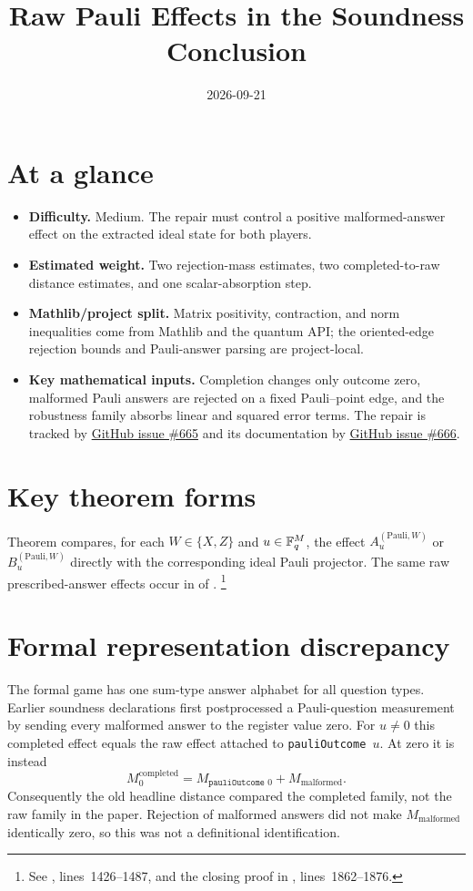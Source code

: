 \documentclass[11pt]{article}
\title{Raw Pauli Effects in the Soundness Conclusion}
\author{}
\date{2026-09-21}
\renewcommand{\ghissue}[1]{%
  \href{https://github.com/Dengnifer/MIPStarRE-QPBT/issues/#1}{GitHub issue \##1}}
\begin{document}
\maketitle

\section{At a glance}

\begin{itemize}
  \item \textbf{Difficulty.} Medium.  The repair must control a positive
  malformed-answer effect on the extracted ideal state for both players.
  \item \textbf{Estimated weight.} Two rejection-mass estimates, two
  completed-to-raw distance estimates, and one scalar-absorption step.
  \item \textbf{Mathlib/project split.} Matrix positivity, contraction, and
  norm inequalities come from Mathlib and the quantum API; the oriented-edge
  rejection bounds and Pauli-answer parsing are project-local.
  \item \textbf{Key mathematical inputs.} Completion changes only outcome
  zero, malformed Pauli answers are rejected on a fixed Pauli--point edge,
  and the robustness family absorbs linear and squared error terms.  The
  repair is tracked by \ghissue{665} and its documentation by \ghissue{666}.
\end{itemize}

\section{Key theorem forms}

Theorem  compares, for each $W\in\{X,Z\}$ and
$u\in\mathbb{F}_q^M$, the effect $A^{(\mathrm{Pauli},W)}_u$ or
$B^{(\mathrm{Pauli},W)}_u$ directly with the corresponding ideal Pauli
projector.  The same raw prescribed-answer effects occur in
 of \cite{Ji2020MIPStar}.%
\footnote{See
,
lines~1426--1487, and the closing proof in
,
lines~1862--1876.}

\section{Formal representation discrepancy}

The formal game has one sum-type answer alphabet for all question types.
Earlier soundness declarations first postprocessed a Pauli-question
measurement by sending every malformed answer to the register value zero.
For $u\ne0$ this completed effect equals the raw effect attached to
\texttt{pauliOutcome $u$}.  At zero it is instead
\[
  M^{\mathrm{completed}}_0
  = M_{\texttt{pauliOutcome }0}+M_{\mathrm{malformed}}.
\]
Consequently the old headline distance compared the completed family, not the
raw family in the paper.  Rejection of malformed answers did not make
$M_{\mathrm{malformed}}$ identically zero, so this was not a definitional
identification.
\end{document}
